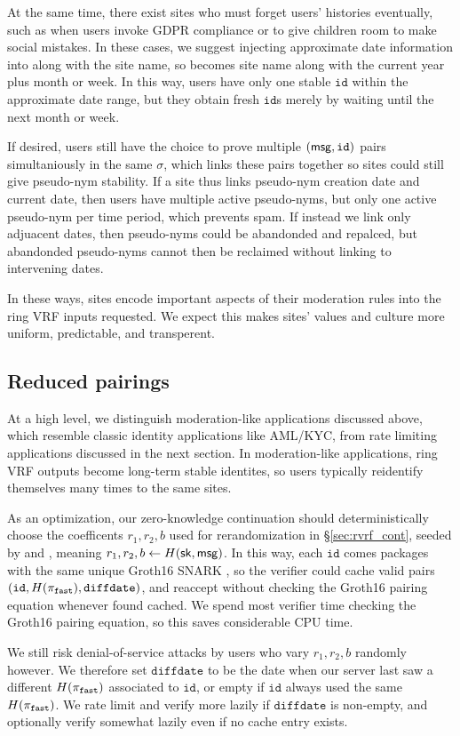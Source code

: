 At the same time, there exist sites who must forget users' histories
eventually, such as when users invoke GDPR compliance or to give children
room to make social mistakes.  In these cases, we suggest injecting
approximate date information into \msg along with the site name,
so \msg becomes site name along with the current year plus month or week.
In this way, users have only one stable $\mathtt{id}$ within the
approximate date range, but they obtain fresh $\mathtt{id}$s merely
by waiting until the next month or week.

If desired, users still have the choice to prove multiple $(\mathsf{msg},\mathtt{id})$
pairs simultaniously in the same $\sigma$, which links these pairs
together so sites could still give pseudo-nym stability.
If a site thus links pseudo-nym creation date and current date, then
users have multiple active pseudo-nyms, but only one active pseudo-nym
per time period, which prevents spam.  If instead we link only adjuacent
dates, then pseudo-nyms could be abandonded and repalced, but abandonded
pseudo-nyms cannot then be reclaimed without linking to intervening dates.

In these ways, sites encode important aspects of their moderation rules
into the ring VRF inputs requested.  We expect this makes sites' values
and culture more uniform, predictable, and transperent.


\subsection{Reduced pairings}
\label{sec:reduced_pairings}

At a high level, we distinguish moderation-like applications discussed
above, which resemble classic identity applications like AML/KYC, from
rate limiting applications discussed in the next section. 
%
In moderation-like applications, ring VRF outputs become long-term
stable identites, so users typically reidentify themselves many times
to the same sites.

As an optimization, our zero-knowledge continuation
should deterministically choose the coefficents $r_1,r_2,b$ used for
rerandomization in \S\ref{sec:rvrf_cont},
 seeded by \msg and \sk, meaning $r_1,r_2,b \leftarrow H(\mathsf{sk},\mathsf{msg})$. 
%
In this way, each $\mathtt{id}$ comes packages with the same unique
Groth16 SNARK \pifast, so the verifier could cache valid pairs
$(\mathtt{id},H(\pi_{\mathtt{fast}}),\mathtt{diffdate})$, and reaccept \pifast
without checking the Groth16 pairing equation whenever found cached.
%
We spend most verifier time checking the Groth16 pairing equation, so
this saves considerable CPU time. %

We still risk denial-of-service attacks by users who vary $r_1,r_2,b$ 
randomly however.  We therefore set $\mathtt{diffdate}$ to be the date
when our server last saw a different $H(\pi_{\mathtt{fast}})$ associated to
$\mathtt{id}$, or empty if $\mathtt{id}$ always used the same $H(\pi_{\mathtt{fast}})$.
We rate limit and verify more lazily if $\mathtt{diffdate}$ is non-empty,
and optionally verify somewhat lazily even if no cache entry exists.

